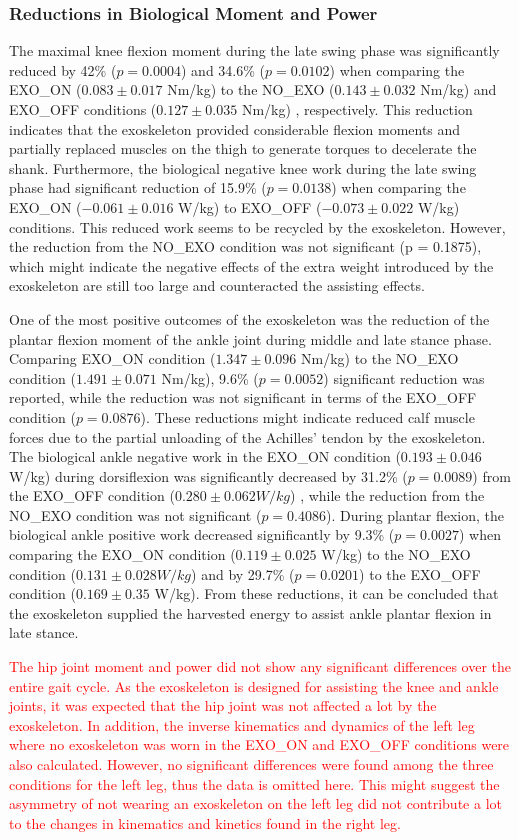 \documentclass[twocolumn,cleanfoot,10pt]{asme2ej}
\begin{document}
\subsubsection{Reductions in Biological Moment and Power}
The maximal knee flexion moment during the late swing phase was significantly reduced by 42\% ($p = 0.0004$) and 34.6\% ($p = 0.0102$) when comparing the EXO\_ON ($0.083\pm0.017$ Nm/kg) to the NO\_EXO ($0.143\pm0.032$ Nm/kg) and EXO\_OFF conditions ($0.127\pm0.035$ Nm/kg) , respectively.
This reduction indicates that the exoskeleton provided considerable flexion moments and partially replaced muscles on the thigh to generate torques to decelerate the shank.
Furthermore, the biological negative knee work during the late swing phase had significant reduction of 15.9\% ($p = 0.0138$) when comparing the EXO\_ON ($-0.061\pm0.016$ W/kg) to EXO\_OFF ($-0.073\pm0.022$ W/kg) conditions.
This reduced work seems to be recycled by the exoskeleton. However, the reduction from the NO\_EXO condition was not significant (p = 0.1875), which might indicate the negative effects of the extra weight introduced by the exoskeleton are still too large and counteracted the assisting effects.

One of the most positive outcomes of the exoskeleton was the reduction of the plantar flexion moment of the ankle joint during middle and late stance phase.
Comparing EXO\_ON condition ($1.347\pm0.096$ Nm/kg) to the NO\_EXO condition ($1.491\pm0.071$ Nm/kg), 9.6\% ($p = 0.0052$) significant reduction was reported, while the reduction was not significant in terms of the EXO\_OFF  condition ($p = 0.0876$).
These reductions might indicate reduced calf muscle forces due to the partial unloading of the Achilles’ tendon by the exoskeleton.
The biological ankle negative work in the EXO\_ON condition ($0.193\pm0.046$ W/kg) during dorsiflexion was significantly decreased by 31.2\% ($p = 0.0089$) from the EXO\_OFF condition ($0.280\pm0.062 W/kg$) , while the reduction from the NO\_EXO condition was not significant ($p = 0.4086$).
During plantar flexion, the biological ankle positive work decreased significantly by 9.3\% ($p = 0.0027$) when comparing the EXO\_ON condition ($0.119\pm0.025$ W/kg) to the NO\_EXO condition ($0.131\pm0.028 W/kg$) and by 29.7\% ($p = 0.0201$) to the EXO\_OFF condition ($0.169\pm0.35$ W/kg).
From these reductions, it can be concluded that the exoskeleton supplied the harvested energy to assist ankle plantar flexion in late stance. 

\textcolor{red}{The hip joint moment and power did not show any significant differences over the entire gait cycle.
As the exoskeleton is designed for assisting the knee and ankle joints, it was expected that the hip joint was not affected a lot by the exoskeleton.
In addition, the inverse kinematics and dynamics of the left leg where no exoskeleton was worn in the EXO\_ON and EXO\_OFF conditions were also calculated.
However, no significant differences were found among the three conditions for the left leg, thus the data is omitted here.
This might suggest the asymmetry of not wearing an exoskeleton on the left leg did not contribute a lot to the changes in kinematics and kinetics found in the right leg.}
\end{document}
